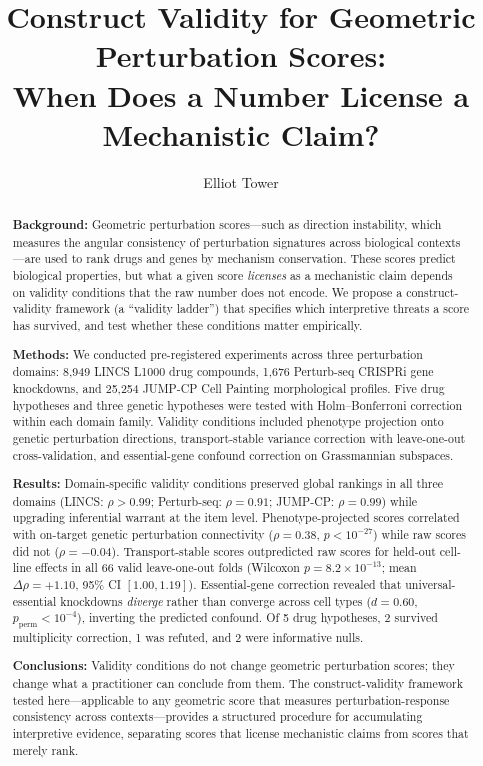 \documentclass[11pt]{article}
\title{Construct Validity for Geometric Perturbation Scores:\\ When Does a Number License a Mechanistic Claim?}
\author{Elliot Tower}
\affil{Independent researcher \\ \texttt{elliot@elliottower.ai}}
\date{}
\begin{document}
\maketitle

\begin{abstract}
\textbf{Background:}
Geometric perturbation scores---such as direction instability, which
measures the angular consistency of perturbation signatures across
biological contexts---are used to rank drugs and genes by mechanism
conservation. These scores predict biological properties, but what
a given score \emph{licenses} as a mechanistic claim depends on
validity conditions that the raw number does not encode. We
propose a construct-validity framework (a ``validity ladder'') that
specifies which interpretive threats a score has survived, and test
whether these conditions matter empirically.

\textbf{Methods:}
We conducted pre-registered experiments across three perturbation
domains: 8{,}949 LINCS L1000 drug compounds, 1{,}676 Perturb-seq
CRISPRi gene knockdowns, and 25{,}254 JUMP-CP Cell Painting
morphological profiles. Five drug hypotheses and three genetic
hypotheses were tested with Holm--Bonferroni correction within each
domain family. Validity conditions included phenotype projection
onto genetic perturbation directions, transport-stable variance
correction with leave-one-out cross-validation, and essential-gene
confound correction on Grassmannian subspaces.

\textbf{Results:}
Domain-specific validity conditions preserved global rankings in all
three domains (LINCS: $\rho > 0.99$; Perturb-seq: $\rho = 0.91$;
JUMP-CP: $\rho = 0.99$) while upgrading inferential warrant at the
item level. Phenotype-projected scores correlated with on-target
genetic perturbation connectivity ($\rho = 0.38$, $p < 10^{-27}$)
while raw scores did not ($\rho = -0.04$). Transport-stable scores
outpredicted raw scores for held-out cell-line effects in all 66
valid leave-one-out folds (Wilcoxon $p = 8.2 \times 10^{-13}$;
mean $\Delta\rho = +1.10$, 95\% CI $[1.00, 1.19]$). Essential-gene
correction revealed that universal-essential knockdowns
\emph{diverge} rather than converge across cell types ($d = 0.60$,
$p_{\text{perm}} < 10^{-4}$), inverting the predicted confound.
Of 5 drug hypotheses, 2 survived multiplicity correction, 1 was
refuted, and 2 were informative nulls.

\textbf{Conclusions:}
Validity conditions do not change geometric perturbation scores;
they change what a practitioner can conclude from them. The
construct-validity framework tested here---applicable to any
geometric score that measures perturbation-response consistency
across contexts---provides a structured procedure for accumulating
interpretive evidence, separating scores that license mechanistic
claims from scores that merely rank.
\end{abstract}
\end{document}

